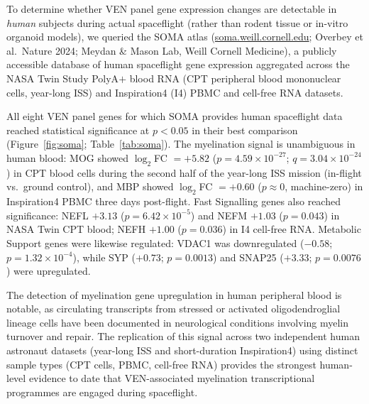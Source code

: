 \documentclass[11pt]{article}
\begin{document}
To determine whether VEN panel gene expression changes are detectable in
\emph{human} subjects during actual spaceflight (rather than rodent tissue
or in-vitro organoid models), we queried the SOMA atlas
(\url{soma.weill.cornell.edu}; Overbey et al.\ Nature 2024; Meydan \&
Mason Lab, Weill Cornell Medicine), a publicly accessible database of
human spaceflight gene expression aggregated across the NASA Twin Study
PolyA$+$ blood RNA (CPT peripheral blood mononuclear cells, year-long ISS)
and Inspiration4 (I4) PBMC and cell-free RNA datasets.

All eight VEN panel genes for which SOMA provides human spaceflight data
reached statistical significance at $p < 0.05$ in their best comparison
(Figure~\ref{fig:soma}; Table~\ref{tab:soma}).
The myelination signal is unambiguous in human blood: MOG showed
$\log_2$FC $= +5.82$ ($p = 4.59 \times 10^{-27}$; $q = 3.04 \times 10^{-24}$)
in CPT blood cells during the second half of the year-long ISS mission
(in-flight vs.\ ground control), and MBP showed $\log_2$FC $= +0.60$
($p \approx 0$, machine-zero) in Inspiration4 PBMC three days post-flight.
Fast Signalling genes also reached significance: NEFL $+3.13$
($p = 6.42 \times 10^{-5}$) and NEFM $+1.03$ ($p = 0.043$) in NASA Twin
CPT blood; NEFH $+1.00$ ($p = 0.036$) in I4 cell-free RNA.
Metabolic Support genes were likewise regulated: VDAC1 was downregulated
($-0.58$; $p = 1.32 \times 10^{-4}$), while SYP ($+0.73$; $p = 0.0013$)
and SNAP25 ($+3.33$; $p = 0.0076$) were upregulated.

The detection of myelination gene upregulation in human peripheral blood
is notable, as circulating transcripts from stressed or activated
oligodendroglial lineage cells have been documented in neurological
conditions involving myelin turnover and repair.
The replication of this signal across two independent human astronaut
datasets (year-long ISS and short-duration Inspiration4) using distinct
sample types (CPT cells, PBMC, cell-free RNA) provides the strongest
human-level evidence to date that VEN-associated myelination transcriptional
programmes are engaged during spaceflight.
\end{document}

